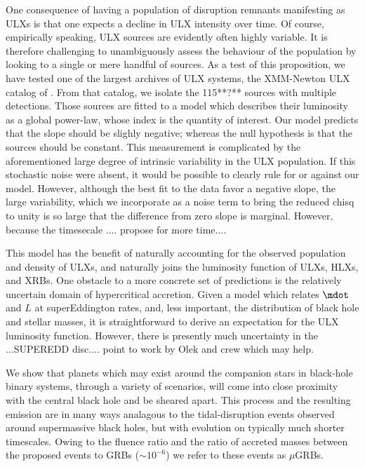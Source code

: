 One consequence of having a population of disruption remnants manifesting as ULXs is that one expects a decline in ULX intensity over time.  Of course, empirically speaking, ULX sources are evidently often highly variable.  It is therefore challenging to unambiguously assess the behaviour of the population by looking to a single or mere handful of sources.  As a test of this proposition, we have tested one of the largest archives of ULX systems, the XMM-Newton ULX catalog of \citep{Walton_2012}.  From that catalog, we isolate the 115**?** sources with multiple detections.  Those sources are fitted to a model which describes their luminosity as a global power-law, whose index is the quantity of interest.  Our model predicts that the slope should be slighly negative; whereas the null hypothesis is that the sources should be constant.   This measurement is complicated by the aforementioned large degree of intrinsic variability in the ULX population.  If this stochastic noise were absent, it would be possible to clearly rule for or against our model.  However, although the best fit to the data favor a negative slope, the large variability, which we incorporate as a noise term to bring the reduced chisq to unity is so large that the difference from zero slope is marginal.  However, because the timesecale .... propose for more time....







This model has the benefit of naturally accounting for the observed population and density of ULXs, and naturally joins the luminosity function of ULXs, HLXs, and XRBs.  One obstacle to a more concrete set of predictions is the relatively uncertain domain of hypercritical accretion.  Given a model which relates $\mdot$ and $L$ at superEddington rates, and, less important, the distribution of black hole and stellar masses, it is straightforward to derive an expectation for the ULX luminosity function.  However, there is presently much uncertainty in the ...SUPEREDD disc.... point to work by Olek and crew which may help.















We show that planets which may exist around the companion stars in
black-hole binary systems, through a variety of scenarios, will come
into close proximity with the central black hole and be sheared apart.
This process and the resulting emission are in many ways analagous to
the tidal-disruption events observed around supermassive black holes,
but with evolution on typically much shorter timescales.  Owing to the
fluence ratio and the ratio of accreted masses between the proposed
events to GRBs ($\sim 10^{-6}$) we refer to these events as $\mu$GRBs.


